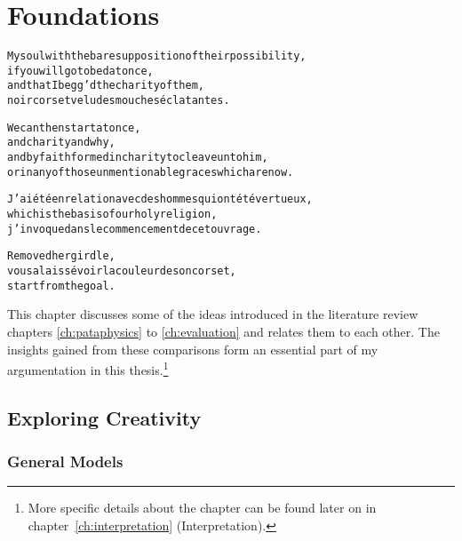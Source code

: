 
\chapter{Foundations}
\label{ch:foundations}

\startcontents[chapters]

\vfill

\begin{alltt}\sffamily
My soul with the bare supposition of their possibility,
if you will go to bed at once,
and that I begg'd the charity of them,
noir corset velu des mouches éclatantes.

We can then start at once,
and charity and why,
and by faith formed in charity to cleave unto him,
or in any of those unmentionable graces which are now.

J'ai été en relation avec des hommes qui ont été vertueux,
which is the basis of our holy religion,
j'invoque dans le commencement de cet ouvrage.

Removed her girdle,
vous a laissé voir la couleur de son corset,
start from the goal.
\end{alltt}

\newpage
\minicontents
\spirals

This chapter discusses some of the ideas introduced in the literature review chapters \ref{ch:pataphysics} to \ref{ch:evaluation} and relates them to each other. The insights gained from these comparisons form an essential part of my argumentation in this thesis.\footnote{More specific details about the  chapter can be found later on in chapter~\ref{ch:interpretation} (Interpretation).}


\section{Exploring Creativity}



\subsection{General Models}
\label{s:models}

